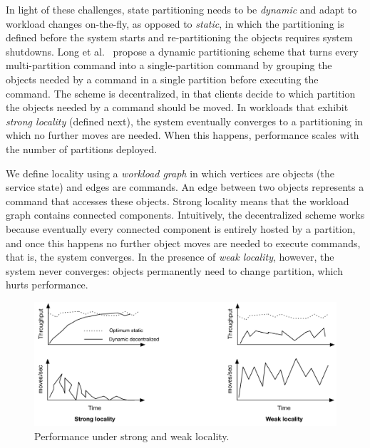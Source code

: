 In light of these challenges, state partitioning needs to be \emph{dynamic} and adapt to workload changes on-the-fly, as opposed to \emph{static}, in which the partitioning is defined before the system starts and re-partitioning the objects requires system shutdowns.
Long et al.~\cite{hoang2016} propose a dynamic partitioning scheme that turns every multi-partition command into a single-partition command by grouping the objects needed by a command in a single partition before executing the command.
The scheme is decentralized, in that clients decide to which partition the objects needed by a command should be moved.
In workloads that exhibit \emph{strong locality} (defined next), the system eventually converges to a partitioning in which no further moves are needed.
When this happens, performance scales with the number of partitions deployed.

We define locality using a \emph{workload graph} in which vertices are objects (the service state) and edges are commands. 
An edge between two objects represents a command that accesses these objects.
Strong locality means that the workload graph contains connected components.
Intuitively, the decentralized scheme works because eventually every connected component is entirely hosted by a partition, and once this happens no further object moves are needed to execute commands, that is, the system converges.
In the presence of \emph{weak locality}, however, the system never converges: objects permanently need to change partition, which hurts performance.

\begin{figure}[ht]
	\center
	\includegraphics[width=0.6\linewidth]{figures/motivation}
	\caption{Performance under strong and weak locality.}
	\label{fig:motivation}
\end{figure}

